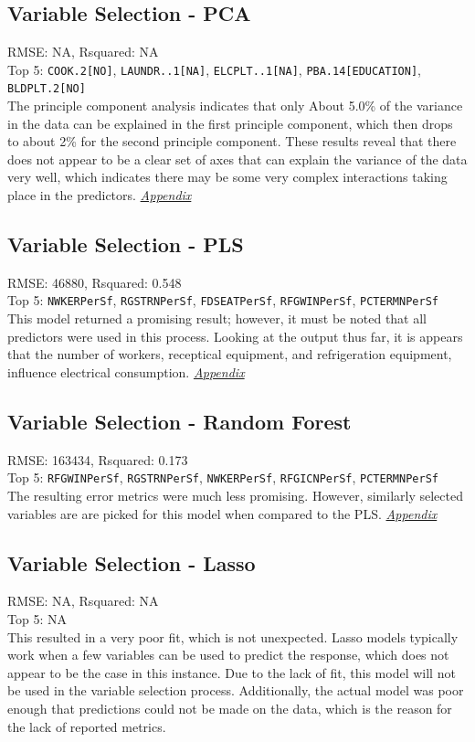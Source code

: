 \subsection{Variable Selection - PCA}
RMSE: NA, Rsquared: NA\\
Top 5: \lstinline{COOK.2[NO]}, \lstinline{LAUNDR..1[NA]}, \lstinline{ELCPLT..1[NA]}, \lstinline{PBA.14[EDUCATION]}, \lstinline{BLDPLT.2[NO]}
\\[0.1in]
\indent The principle component analysis indicates that only About 5.0\% of the variance in the data can be explained in the first principle component, which then drops to about 2\% for the second principle component.  These results reveal that there does not appear to be a clear set of axes that can explain the variance of the data very well, which indicates there may be some very complex interactions taking place in the predictors.  \textit{\hyperref[appendix:electricity:pca]{Appendix}}

\subsection{Variable Selection - PLS}
RMSE: 46880, Rsquared: 0.548\\
Top 5: \lstinline{NWKERPerSf}, \lstinline{RGSTRNPerSf}, \lstinline{FDSEATPerSf}, \lstinline{RFGWINPerSf}, \lstinline{PCTERMNPerSf}
\\[0.1in]
\indent This model returned a promising result; however, it must be noted that all predictors were used in this process.  Looking at the output thus far, it is appears that the number of workers, receptical equipment, and refrigeration equipment, influence electrical consumption.  \textit{\hyperref[appendix:electricity:pls]{Appendix}}

\subsection{Variable Selection - Random Forest}
RMSE: 163434, Rsquared: 0.173\\
Top 5: \lstinline{RFGWINPerSf}, \lstinline{RGSTRNPerSf}, \lstinline{NWKERPerSf}, \lstinline{RFGICNPerSf},  \lstinline{PCTERMNPerSf}
\\[0.1in]
\indent The resulting error metrics were much less promising.  However, similarly selected variables are are picked for this model when compared to the PLS.  \textit{\hyperref[appendix:electricity:rf]{Appendix}}

\subsection{Variable Selection - Lasso}
RMSE: NA, Rsquared: NA\\
 Top 5: NA
\\[0.1in]
\indent This resulted in a very poor fit, which is not unexpected.  Lasso models typically work when a few variables can be used to predict the response, which does not appear to be the case in this instance.  Due to the lack of fit, this model will not be used in the variable selection process.  Additionally, the actual model was poor enough that predictions could not be made on the data, which is the reason for the lack of reported metrics.

